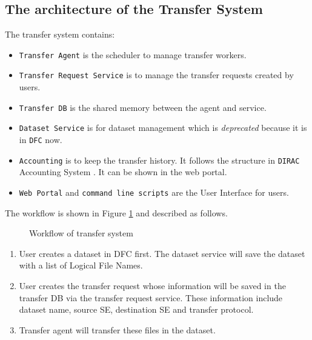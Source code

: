 \subsection{The architecture of the Transfer System}

The transfer system contains:

\begin{itemize}
    \item {\tt Transfer Agent} is the scheduler to manage transfer workers.
    \item {\tt Transfer Request Service} is to manage the transfer requests
          created by users.
    \item {\tt Transfer DB} is the shared memory between the agent and 
          service. 
    \item {\tt Dataset Service} is for dataset management which is 
          {\em deprecated} because it is in {\tt DFC} now.
    \item {\tt Accounting} is to keep the transfer history.
          It follows the structure in {\tt DIRAC} Accounting System
          \cite{bib:diracacct}.
          It can be shown in the web portal.
    \item {\tt Web Portal} and {\tt command line scripts} are the 
          User Interface for users.
\end{itemize}

The workflow is shown in Figure \ref{fig:workflow} and described as follows.
\begin{figure}[htbp]
    
    \caption{Workflow of transfer system} \label{fig:workflow}
\end{figure}

\begin{enumerate}
\item User creates a dataset in DFC first. The dataset service
    will save the dataset with a list of Logical File Names.
\item User creates the transfer request
whose information will be saved in the transfer DB via
the transfer request service. These information include
dataset name, source SE, destination SE and transfer protocol.
\item Transfer agent will transfer these files in the dataset.
\end{enumerate}

